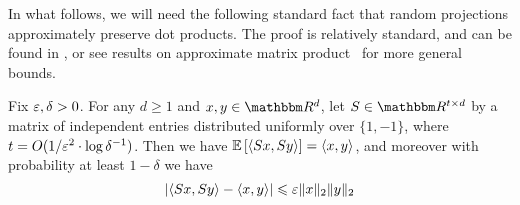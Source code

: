 In what follows, we will need the following standard fact that random projections approximately preserve dot products. The proof is relatively standard, and can be found in \cite{arriaga2006algorithmic}, or see results on approximate matrix product~\cite{woodruff2014sketching} for more general bounds. 
\begin{fact}\label{fact:JL}
Fix $\varepsilon,\delta>0$. For any $d \geq 1$ and $x,y \in \R^d$, let $S \in \R^{t \times d}$ by a matrix of independent entries distributed uniformly over $\{1,-1\}$, where $t= O(1/\varepsilon^2 \cdot \log \delta^{-1})$. Then we have $\mathop{ \mathbb{E}\left[ \langle Sx, Sy \rangle \right]} = \langle x, y \rangle$, and moreover with probability at least $1-\delta$ we have \[|\langle Sx, Sy \rangle - \langle x, y \rangle| \leqslant \varepsilon  \|x\|_2 \|y\|_2\]
\end{fact}

